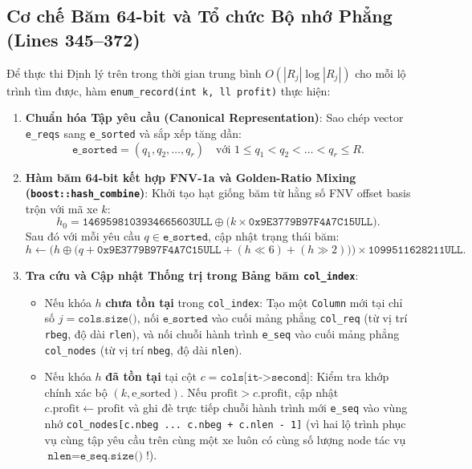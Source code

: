\documentclass[11pt,a4paper]{article}
\theoremstyle{definition}
\begin{document}
\subsection{Cơ chế Băm 64-bit và Tổ chức Bộ nhớ Phẳng (Lines 345--372)}
Để thực thi Định lý trên trong thời gian trung bình $O(|R_j| \log |R_j|)$ cho mỗi lộ trình tìm được, hàm \texttt{enum\_record(int k, ll profit)} thực hiện:

\begin{enumerate}[leftmargin=1.5em]
    \item \textbf{Chuẩn hóa Tập yêu cầu (Canonical Representation)}: Sao chép vector \texttt{e\_reqs} sang \texttt{e\_sorted} và sắp xếp tăng dần:
    \[
        \texttt{e\_sorted} = (q_1, q_2, \dots, q_r) \quad \text{với } 1 \le q_1 < q_2 < \dots < q_r \le R.
    \]
    \item \textbf{Hàm băm 64-bit kết hợp FNV-1a và Golden-Ratio Mixing (\texttt{boost::hash\_combine})}:
    Khởi tạo hạt giống băm từ hằng số FNV offset basis trộn với mã xe $k$:
    \begin{equation}
        h_0 = \texttt{1469598103934665603ULL} \oplus \big(k \times \texttt{0x9E3779B97F4A7C15ULL}\big).
    \end{equation}
    Sau đó với mỗi yêu cầu $q \in \texttt{e\_sorted}$, cập nhật trạng thái băm:
    \begin{equation}
        h \leftarrow \Big(h \oplus \big(q + \texttt{0x9E3779B97F4A7C15ULL} + (h \ll 6) + (h \gg 2)\big)\Big) \times \texttt{1099511628211ULL}.
    \end{equation}
    \item \textbf{Tra cứu và Cập nhật Thống trị trong Bảng băm \texttt{col\_index}}:
    \begin{itemize}[leftmargin=1.2em]
        \item Nếu khóa $h$ \textbf{chưa tồn tại} trong \texttt{col\_index}: Tạo một \texttt{Column} mới tại chỉ số $j = \texttt{cols.size()}$, nối $\texttt{e\_sorted}$ vào cuối mảng phẳng \texttt{col\_req} (từ vị trí \texttt{rbeg}, độ dài \texttt{rlen}), và nối chuỗi hành trình \texttt{e\_seq} vào cuối mảng phẳng \texttt{col\_nodes} (từ vị trí \texttt{nbeg}, độ dài \texttt{nlen}).
        \item Nếu khóa $h$ \textbf{đã tồn tại} tại cột $c = \texttt{cols[it->second]}$: Kiểm tra khớp chính xác bộ $(k, \text{e\_sorted})$. Nếu $\text{profit} > c.\text{profit}$, cập nhật $c.\text{profit} \leftarrow \text{profit}$ và ghi đè trực tiếp chuỗi hành trình mới \texttt{e\_seq} vào vùng nhớ \texttt{col\_nodes[c.nbeg ... c.nbeg + c.nlen - 1]} (vì hai lộ trình phục vụ cùng tập yêu cầu trên cùng một xe luôn có cùng số lượng node tác vụ $\texttt{nlen} = \texttt{e\_seq.size()}$!).
    \end{itemize}
\end{enumerate}
\end{document}
